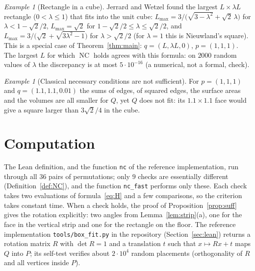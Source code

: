 \documentclass[11pt]{article}
\theoremstyle{definition}
\theoremstyle{remark}
\newtheorem{example}[theorem]{Example}
\newcommand{\NC}{\operatorname{NC}}
\begin{document}
\begin{example}[Rectangle in a cube]
Jerrard and Wetzel \cite[Theorem~5]{JerrardWetzel2004} found the largest $L\times\lambda L$ rectangle
($0<\lambda\le1$) that fits into the unit cube: $L_{\max}=3/\bigl(\sqrt{3-\lambda^2}+\sqrt2\,\lambda\bigr)$ for
$\lambda<1-\sqrt2/2$, $L_{\max}=\sqrt2$ for $1-\sqrt2/2\le\lambda\le\sqrt2/2$, and
$L_{\max}=3/\bigl(\sqrt2+\sqrt{3\lambda^2-1}\bigr)$ for $\lambda>\sqrt2/2$ (for $\lambda=1$ this is Nieuwland's
square). This is a special case of Theorem~\ref{thm:main}: $q=(L,\lambda L,0)$, $p=(1,1,1)$. The largest $L$
for which $\NC$ holds agrees with this formula: on $2000$ random values of $\lambda$ the discrepancy is at
most $5\cdot10^{-16}$ (a numerical, not a formal, check).
\end{example}

\begin{example}[Classical necessary conditions are not sufficient]
For $p=(1,1,1)$ and $q=(1.1,1.1,0.01)$ the sums of edges, of squared edges, the surface areas and the
volumes are all smaller for $Q$, yet $Q$ does not fit: its $1.1\times1.1$ face would give a square
larger than $3\sqrt2/4$ in the cube.
\end{example}

\section{Computation}\label{sec:computation}

The Lean definition, and the function \texttt{nc} of the reference implementation, run through all
$36$ pairs of permutations; only $9$ checks are essentially different (Definition~\ref{def:NC}), and
the function \texttt{nc\_fast} performs only these. Each check takes two evaluations of
formula~\eqref{eq:H} and a few comparisons, so the criterion takes constant time. When a check holds, the proof of Proposition~\ref{prop:suff} gives the rotation
explicitly: two angles from Lemma~\ref{lem:strip}(a), one for the face in the vertical strip and one
for the rectangle on the floor. The reference implementation \texttt{tools/box\_fit.py} in the
repository (Section~\ref{sec:lean}) returns a rotation matrix $R$ with $\det R=1$ and a translation
$t$ such that $x\mapsto Rx+t$ maps $Q$ into $P$; its self-test verifies about $2\cdot10^4$ random
placements (orthogonality of $R$ and all vertices inside $P$).
\end{document}
